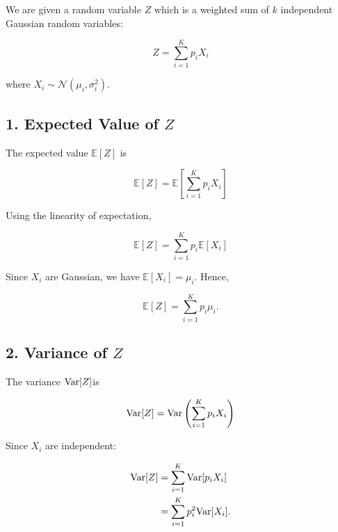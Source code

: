 
We are given a random variable $Z$ which is a weighted sum of $k$ independent
Gaussian random variables:

\begin{equation*}
    Z = \sum_{i=1}^K p_i X_i
\end{equation*}

where $X_i \sim \mathcal{N}(\mu_i, \sigma_i^2)$.

\subsection*{1. Expected Value of $Z$}

The expected value $\mathbb{E}[Z]$ is

\begin{equation*}
    \mathbb{E}[Z] = \mathbb{E} \left[ \sum_{i=1}^K p_i X_i \right]
\end{equation*}

Using the linearity of expectation,

\begin{equation*}
    \mathbb{E}[Z] = \sum_{i=1}^K p_i \mathbb{E}[X_i]
\end{equation*}

Since $X_i$ are Gaussian, we have $\mathbb{E}[X_i] = \mu_i$. Hence,

\begin{equation}
    \mathbb{E}[Z] = \sum_{i=1}^K p_i \mu_i.
    \label{e5.1}
\end{equation}

\subsection*{2. Variance of $Z$}

The variance $\text{Var}[Z]$is

\begin{equation*}
    \text{Var}[Z] = \text{Var}\left( \sum_{i=1}^K p_i X_i \right)
\end{equation*}

Since $X_i$ are independent:

\begin{equation*}
    \begin{aligned}
        \text{Var}[Z] &= \sum_{i=1}^{K}\text{Var}[p_iX_i] \\
        &= \sum_{i=1}^K p_i^2 \text{Var}[X_i].
    \end{aligned}
\end{equation*}

